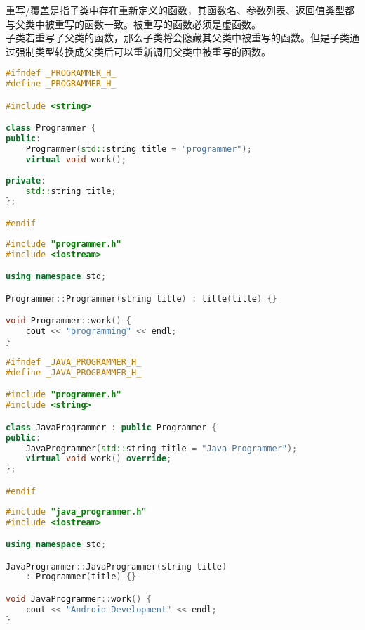 重写/覆盖是指子类中存在重新定义的函数，其函数名、参数列表、返回值类型都与父类中被重写的函数一致。被重写的函数必须是虚函数。\\

子类若重写了父类的函数，那么子类将会隐藏其父类中被重写的函数。但是子类通过强制类型转换成父类后可以重新调用父类中被重写的函数。\\


\begin{lstlisting}[language=C++, title=programmer.h]
#ifndef _PROGRAMMER_H_
#define _PROGRAMMER_H_

#include <string>

class Programmer {
public:
	Programmer(std::string title = "programmer");
	virtual void work();
	
private:
	std::string title;
};

#endif
\end{lstlisting}

\begin{lstlisting}[language=C++, title=programmer.cpp]
#include "programmer.h"
#include <iostream>

using namespace std;

Programmer::Programmer(string title) : title(title) {}

void Programmer::work() {
	cout << "programming" << endl;
}
\end{lstlisting}

\begin{lstlisting}[language=C++, title=java\_programmer.h]
#ifndef _JAVA_PROGRAMMER_H_
#define _JAVA_PROGRAMMER_H_

#include "programmer.h"
#include <string>

class JavaProgrammer : public Programmer {
public:
	JavaProgrammer(std::string title = "Java Programmer");
	virtual void work() override;
};

#endif
\end{lstlisting}

\begin{lstlisting}[language=C++, title=java\_programmer.cpp]
#include "java_programmer.h"
#include <iostream>

using namespace std;

JavaProgrammer::JavaProgrammer(string title) 
	: Programmer(title) {}

void JavaProgrammer::work() {
	cout << "Android Development" << endl;
}
\end{lstlisting}

